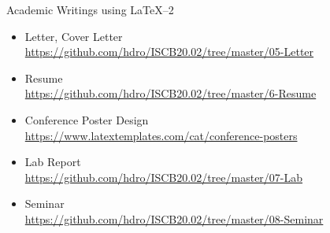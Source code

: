 \begin{frame}[t]{Academic Writings using \LaTeX --2}
	\begin{itemize}
		\item Letter, Cover Letter \\ 
		\url{https://github.com/hdro/ISCB20.02/tree/master/05-Letter}
		\item Resume \\ 
		\url{https://github.com/hdro/ISCB20.02/tree/master/6-Resume}
		\item Conference Poster Design \\ 
		\url{https://www.latextemplates.com/cat/conference-posters}
		\item Lab Report \\ 
		\url{https://github.com/hdro/ISCB20.02/tree/master/07-Lab}
		\item Seminar \\ 
		\url{https://github.com/hdro/ISCB20.02/tree/master/08-Seminar}
	\end{itemize}
\end{frame}




